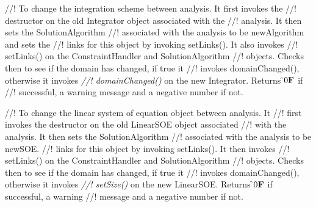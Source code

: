 //! To change the integration scheme between analysis. It first invokes the
//! destructor on the old Integrator object associated with the
//! analysis. It then sets the SolutionAlgorithm 
//! associated with the analysis to be \p newAlgorithm and sets the
//! links for this object by invoking setLinks(). It also invokes
//! setLinks() on the ConstraintHandler and SolutionAlgorithm
//! objects. Checks then to see if the domain has changed, if true it
//! invokes domainChanged(), otherwise it invokes {\em
//! domainChanged()} on the new Integrator. Returns \f$0{\bf F}$ if
//! successful, a warning message and a negative number if not.

//! To change the linear system of equation object between analysis. It
//! first invokes the destructor on the old LinearSOE object associated
//! with the analysis. It then sets the SolutionAlgorithm 
//! associated with the analysis to be \p newSOE.
//! links for this object by invoking setLinks(). It then invokes
//! setLinks() on the ConstraintHandler and SolutionAlgorithm
//! objects. Checks then to see if the domain has changed, if true it
//! invokes domainChanged(), otherwise it invokes {\em
//! setSize()} on the new LinearSOE. Returns \f$0{\bf F}$ if successful, a warning
//! message and a negative number if not. 


